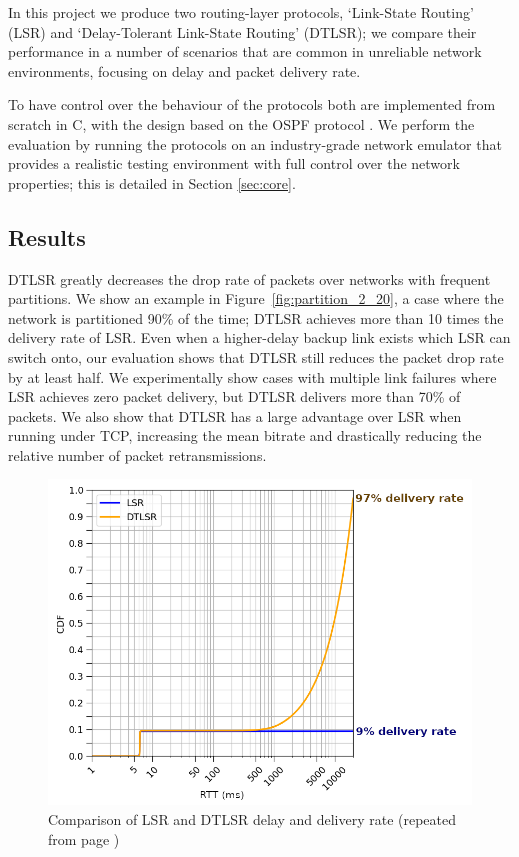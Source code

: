 \documentclass[withindex,glossary,openany]{cam-thesis}
\newcommand{\repeatcaption}[2]{%
  \renewcommand{\thefigure}{\ref{#1}}%
  \captionsetup{list=no}%
  \caption{#2 (repeated from page \pageref{#1})}%
  \addtocounter{figure}{-1}%
}
\begin{document}
In this project we produce two routing-layer protocols, `Link-State Routing' (LSR) and `Delay-Tolerant Link-State Routing' (DTLSR); we compare their performance in a number of scenarios that are common in unreliable network environments, focusing on delay and packet delivery rate.

To have control over the behaviour of the protocols both are implemented from scratch in C, with the design based on the OSPF protocol \cite{OSPF}. We perform the evaluation by running the protocols on an industry-grade network emulator \cite{CORE} that provides a realistic testing environment with full control over the network properties; this is detailed in Section \ref{sec:core}.

\subsection{Results}

\begin{minipage}{1\textwidth}

DTLSR greatly decreases the drop rate of packets over networks with frequent partitions. We show an example in Figure~\ref{fig:partition_2_20}, a case where the network is partitioned 90\% of the time; DTLSR achieves more than 10 times the delivery rate of LSR. Even when a higher-delay backup link exists which LSR can switch onto, our evaluation shows that DTLSR still reduces the packet drop rate by at least half. We experimentally show cases with multiple link failures where LSR achieves zero packet delivery, but DTLSR delivers more than 70\% of packets. We also show that DTLSR has a large advantage over LSR when running under TCP, increasing the mean bitrate and drastically reducing the relative number of packet retransmissions.

\begin{figure}[H]
  \centering
  \hspace*{2.4cm}
  \includegraphics[width=0.8\linewidth]{delay_partition_flap2_20}
  \repeatcaption{fig:partition_2_20}{Comparison of LSR and DTLSR delay and delivery rate}
\end{figure}

\end{minipage}
\end{document}
